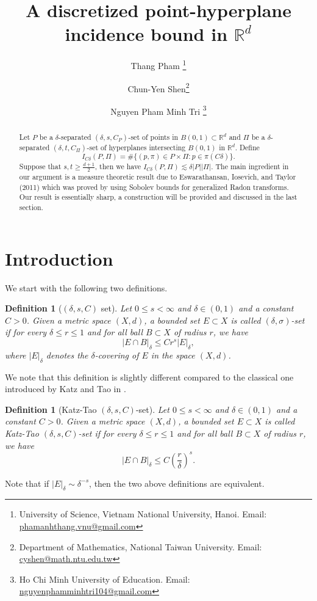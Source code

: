 \documentclass[11pt]{article}
\newtheorem{definition}[theorem]{Definition}
\newcommand{\1}{\mathbf{1}}
\begin{document}
\title{A discretized point-hyperplane incidence bound in $\mathbb{R}^d$}

\author{Thang Pham \thanks{University of Science, Vietnam National University, Hanoi. Email: \href{mailto:phamanhthang.vnu@gmail.com}{phamanhthang.vnu@gmail.com}}\and Chun-Yen Shen\thanks{Department of Mathematics, National Taiwan University. Email: \href{mailto:cyshen@math.ntu.edu.tw}{cyshen@math.ntu.edu.tw}}\and Nguyen Pham Minh Tri \thanks{Ho Chi Minh University of Education. Email: \href{mailto: nguyenphamminhtri104@gmail.com}{nguyenphamminhtri104@gmail.com}}}
\date{}
\maketitle
\begin{abstract}
    Let $P$ be a $\delta$-separated $(\delta, s, C_P)$-set of points in $B(0, 1)\subset \mathbb{R}^d$ and $\Pi$ be a $\delta$-separated $(\delta, t, C_\Pi)$-set of hyperplanes intersecting $B(0, 1)$ in $\mathbb{R}^d$. Define
    \[I_{C\delta}(P, \Pi)=\#\{(p, \pi)\in P\times \Pi\colon p\in \pi(C\delta)\}.\] Suppose that $s, t\ge \frac{d+1}{2}$,
    then we have $I_{C\delta}(P, \Pi)\lesssim \delta |P||\Pi|$. The main ingredient in our argument is a measure theoretic result due to Eswarathansan, Iosevich, and Taylor (2011) which was proved by using Sobolev bounds for generalized Radon transforms. Our result is essentially sharp, a construction will be provided and discussed in the last section.
\end{abstract}
\section{Introduction}
We start with the following two definitions.
\begin{definition}[$(\delta, s, C)$ set]\label{df:our}
    Let $0\le s <\infty$ and $\delta\in (0,1)$ and a constant $C>0$. Given a metric space $(X, d)$, a bounded set $E\subset X$ is called $(\delta,\sigma)$-set if for every $\delta\le r\le 1$ and for all ball $B\subset X$ of radius $r$, we have
    \[|E\cap B|_\delta\le C r^s|E|_{\delta},\]
    where $|E|_\delta$ denotes the $\delta$-covering of $E$ in the space $(X, d)$.
\end{definition}
We note that this definition is slightly different compared to the classical one introduced by Katz and Tao in \cite{KatzTao}.
\begin{definition}[Katz-Tao $(\delta, s, C)$-set]\label{def:kt}
    Let $0\le s <\infty$ and $\delta\in (0,1)$ and a constant $C>0$. Given a metric space $(X, d)$, a bounded set $E\subset X$ is called Katz-Tao $(\delta, s, C)$-set if for every $\delta\le r\le 1$ and for all ball $B\subset X$ of radius $r$, we have
    \[|E\cap B|_\delta\le C \left(\frac{r}{\delta}\right)^s.\]

\end{definition}
Note that if $|E|_{\delta}\sim \delta^{-s}$, then the two above definitions are equivalent.
\end{document}
